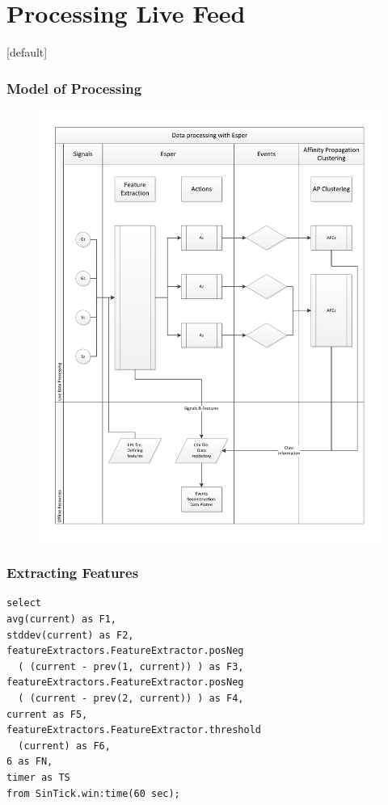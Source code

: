 \documentclass{beamer}
\begin{document}
\section{Processing Live Feed}
  {
  \makeatletter
    [default]
    \def\beamer@entrycode{\vspace*{-\headheight}}
  \makeatother
  \begin{frame}
    \frametitle{Model of Processing} 
    \begin{figure}[htbp]
      \includegraphics[scale=.31]{./gfx/model.pdf}
    \end{figure}
  \end{frame}
  }

  \begin{frame}[containsverbatim]
    \frametitle{Extracting Features}
    \begin{lstlisting}
select
avg(current) as F1,
stddev(current) as F2,
featureExtractors.FeatureExtractor.posNeg
  ( (current - prev(1, current)) ) as F3,
featureExtractors.FeatureExtractor.posNeg
  ( (current - prev(2, current)) ) as F4,
current as F5,
featureExtractors.FeatureExtractor.threshold
  (current) as F6,
6 as FN,
timer as TS
from SinTick.win:time(60 sec);
    \end{lstlisting}
  \end{frame}
\end{document}
